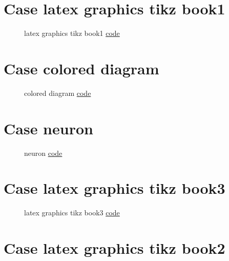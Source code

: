 \documentclass{article}
\begin{document}
\section{Case latex graphics tikz book1}

\begin{figure}[H]
	\centering
	
	\caption{latex graphics tikz book1 \href{https:/github.com/cauliyang/learn_tikz/blob/main/source/latex_graphics_tikz_book1.tex}{code} }
	\label{fig:latex graphics tikz book1}
\end{figure}

\section{Case colored diagram}

\begin{figure}[H]
	\centering
	
	\caption{colored diagram \href{https:/github.com/cauliyang/learn_tikz/blob/main/source/colored_diagram.tex}{code} }
	\label{fig:colored diagram}
\end{figure}

\section{Case neuron}

\begin{figure}[H]
	\centering
	
	\caption{neuron \href{https:/github.com/cauliyang/learn_tikz/blob/main/source/neuron.tex}{code} }
	\label{fig:neuron}
\end{figure}

\section{Case latex graphics tikz book3}

\begin{figure}[H]
	\centering
	
	\caption{latex graphics tikz book3 \href{https:/github.com/cauliyang/learn_tikz/blob/main/source/latex_graphics_tikz_book3.tex}{code} }
	\label{fig:latex graphics tikz book3}
\end{figure}

\section{Case latex graphics tikz book2}
\end{document}
